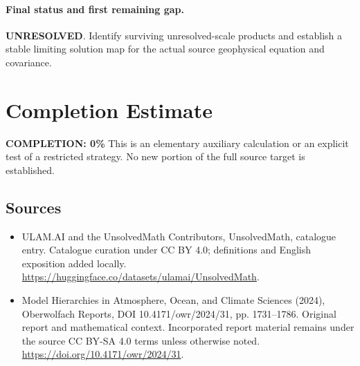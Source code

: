 \documentclass[11pt]{article}
\begin{document}
\paragraph{Final status and first remaining gap.}
\textbf{UNRESOLVED}. Identify surviving unresolved-scale products and establish a stable limiting solution map for the actual source geophysical equation and covariance.

\section{Completion Estimate}
\noindent\textbf{COMPLETION: 0\%}
This is an elementary auxiliary calculation or an explicit test of a restricted strategy. No new portion of the full source target is established.

\subsection{Sources}
\begin{itemize}
\item[\hypertarget{source:statement:1}{S1}] ULAM.AI and the UnsolvedMath Contributors, UnsolvedMath, catalogue entry. Catalogue curation under CC BY 4.0; definitions and English exposition added locally.
\url{https://huggingface.co/datasets/ulamai/UnsolvedMath}.
\item[\hypertarget{source:statement:2}{S2}] Model Hierarchies in Atmosphere, Ocean, and Climate Sciences (2024), Oberwolfach Reports, DOI 10.4171/owr/2024/31, pp. 1731--1786. Original report and mathematical context. Incorporated report material remains under the source CC BY-SA 4.0 terms unless otherwise noted.
\url{https://doi.org/10.4171/owr/2024/31}.
\end{itemize}
\label{end:statement}
\end{document}
